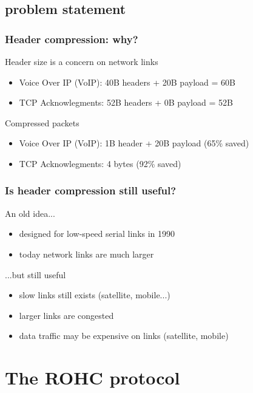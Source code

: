 \documentclass[utf8]{beamer}
\begin{document}
\subsection{problem statement}
\begin{frame}
	\frametitle{Header compression: why?}
	\begin{block}{Header size is a concern on network links}
		\pause
		\begin{itemize}
			\item Voice Over IP (VoIP): 40B headers + 20B payload = 60B
			\item TCP Acknowlegments: 52B headers + 0B payload = 52B
		\end{itemize}
	\end{block}
	\pause
	\begin{block}{Compressed packets}
		\begin{itemize}
			\item Voice Over IP (VoIP): 1B header + 20B payload (65\% saved)
			\item TCP Acknowlegments: 4 bytes (92\% saved)
		\end{itemize}
	\end{block}
\end{frame}
\begin{frame}
	\frametitle{Is header compression still useful?}
	\pause
	\begin{block}{An old idea...}
		\begin{itemize}
			\item designed for low-speed serial links in 1990
			\item today network links are much larger
		\end{itemize}
	\end{block}
	\pause
	\begin{block}{...but still useful}
		\begin{itemize}
			\item slow links still exists (satellite, mobile...)
			\item larger links are congested
			\item data traffic may be expensive on links (satellite, mobile)
		\end{itemize}
	\end{block}
\end{frame}




\section{The ROHC protocol}
\end{document}
